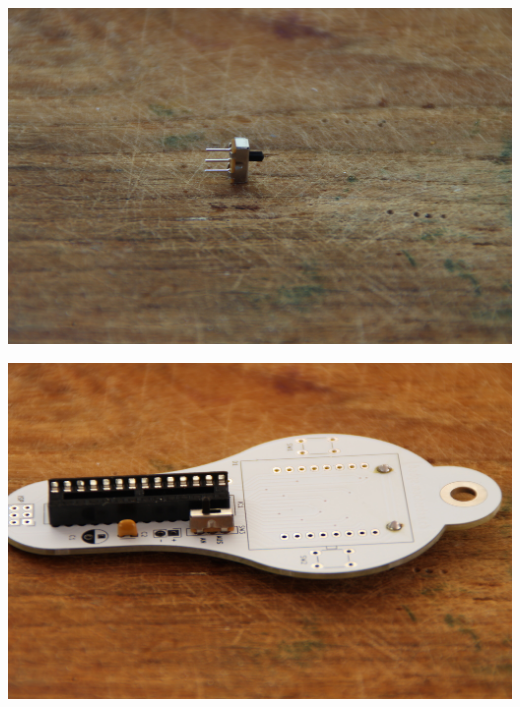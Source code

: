 \documentclass{article}
\begin{document}
\begin{minipage}[b]{0.5\textwidth}
	\includegraphics[width=\textwidth]{Bilder2023/IMG_8366.JPG}
\end{minipage}
\begin{minipage}[b]{0.5\textwidth}
	\includegraphics[width=\textwidth]{Bilder2023/IMG_8367.JPG}
\end{minipage}

\vspace{0.5cm}
\end{document}
